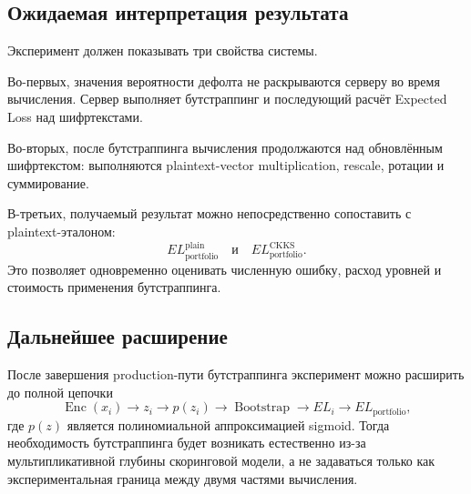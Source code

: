 \subsection{Ожидаемая интерпретация результата}

Эксперимент должен показывать три свойства системы.

Во-первых, значения вероятности дефолта не раскрываются серверу во время
вычисления. Сервер выполняет бутстраппинг и последующий расчёт Expected Loss
над шифртекстами.

Во-вторых, после бутстраппинга вычисления продолжаются над обновлённым
шифртекстом: выполняются plaintext-vector multiplication, rescale, ротации и
суммирование.

В-третьих, получаемый результат можно непосредственно сопоставить с
plaintext-эталоном:
\[
    EL_{\mathrm{portfolio}}^{\mathrm{plain}}
    \quad\text{и}\quad
    EL_{\mathrm{portfolio}}^{\mathrm{CKKS}}.
\]
Это позволяет одновременно оценивать численную ошибку, расход уровней и
стоимость применения бутстраппинга.

\subsection{Дальнейшее расширение}

После завершения production-пути бутстраппинга эксперимент можно расширить до
полной цепочки
\[
\operatorname{Enc}(x_i)
\to z_i
\to p(z_i)
\to \operatorname{Bootstrap}
\to EL_i
\to EL_{\mathrm{portfolio}},
\]
где $p(z)$ является полиномиальной аппроксимацией sigmoid. Тогда необходимость
бутстраппинга будет возникать естественно из-за мультипликативной глубины
скоринговой модели, а не задаваться только как экспериментальная граница
между двумя частями вычисления.
